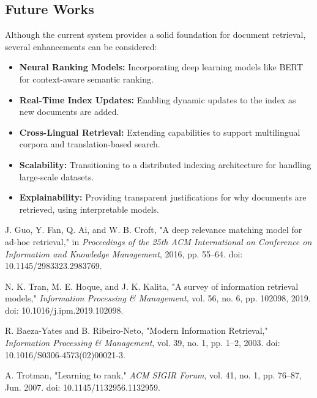 \documentclass[conference]{IEEEtran}
\begin{document}
\subsection*{Future Works}
Although the current system provides a solid foundation for document retrieval, several enhancements can be considered:

\begin{itemize}
    \item \textbf{Neural Ranking Models:} Incorporating deep learning models like BERT for context-aware semantic ranking.
    \item \textbf{Real-Time Index Updates:} Enabling dynamic updates to the index as new documents are added.
    \item \textbf{Cross-Lingual Retrieval:} Extending capabilities to support multilingual corpora and translation-based search.
    \item \textbf{Scalability:} Transitioning to a distributed indexing architecture for handling large-scale datasets.
    \item \textbf{Explainability:} Providing transparent justifications for why documents are retrieved, using interpretable models.
\end{itemize}

\begin{thebibliography}{00}
 J. Guo, Y. Fan, Q. Ai, and W. B. Croft, "A deep relevance matching model for ad-hoc retrieval," in \textit{Proceedings of the 25th ACM International on Conference on Information and Knowledge Management}, 2016, pp. 55–64. doi: 10.1145/2983323.2983769.

 N. K. Tran, M. E. Hoque, and J. K. Kalita, "A survey of information retrieval models," \textit{Information Processing \& Management}, vol. 56, no. 6, pp. 102098, 2019. doi: 10.1016/j.ipm.2019.102098.

 R. Baeza-Yates and B. Ribeiro-Neto, "Modern Information Retrieval," \textit{Information Processing \& Management}, vol. 39, no. 1, pp. 1–2, 2003. doi: 10.1016/S0306-4573(02)00021-3.

 A. Trotman, "Learning to rank," \textit{ACM SIGIR Forum}, vol. 41, no. 1, pp. 76–87, Jun. 2007. doi: 10.1145/1132956.1132959.

\end{thebibliography}
\end{document}
